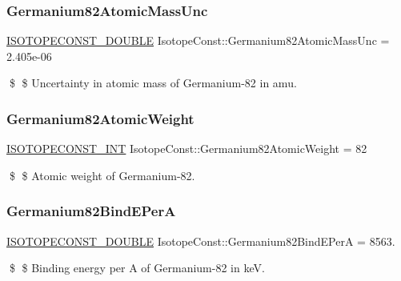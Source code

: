 \subsubsection{\texorpdfstring{Germanium82\+Atomic\+Mass\+Unc}{Germanium82AtomicMassUnc}}
{\footnotesize\ttfamily \mbox{\hyperlink{group___isotope_const-_macros_ga8f45a7272ce02c0b4c65c44636ed719a}{I\+S\+O\+T\+O\+P\+E\+C\+O\+N\+S\+T\+\_\+\+D\+O\+U\+B\+LE}} Isotope\+Const\+::\+Germanium82\+Atomic\+Mass\+Unc = 2.\+405e-\/06}

\$ \$ Uncertainty in atomic mass of Germanium-\/82 in amu. \mbox{\label{group___isotope_const-_germanium-_ge82_ga2770f84bcf2969f56a60ce5164b0c5bf}} 
\subsubsection{\texorpdfstring{Germanium82\+Atomic\+Weight}{Germanium82AtomicWeight}}
{\footnotesize\ttfamily \mbox{\hyperlink{group___isotope_const-_macros_ga5f18360b3e99483a35c32d789e62621c}{I\+S\+O\+T\+O\+P\+E\+C\+O\+N\+S\+T\+\_\+\+I\+NT}} Isotope\+Const\+::\+Germanium82\+Atomic\+Weight = 82}

\$ \$ Atomic weight of Germanium-\/82. \mbox{\label{group___isotope_const-_germanium-_ge82_ga09223be73864deee2853d82b0779705e}} 
\subsubsection{\texorpdfstring{Germanium82\+Bind\+E\+PerA}{Germanium82BindEPerA}}
{\footnotesize\ttfamily \mbox{\hyperlink{group___isotope_const-_macros_ga8f45a7272ce02c0b4c65c44636ed719a}{I\+S\+O\+T\+O\+P\+E\+C\+O\+N\+S\+T\+\_\+\+D\+O\+U\+B\+LE}} Isotope\+Const\+::\+Germanium82\+Bind\+E\+PerA = 8563.}

\$ \$ Binding energy per A of Germanium-\/82 in keV. \mbox{\label{group___isotope_const-_germanium-_ge82_gae1a5dccbb88285edc554475f5062d45e}} 
